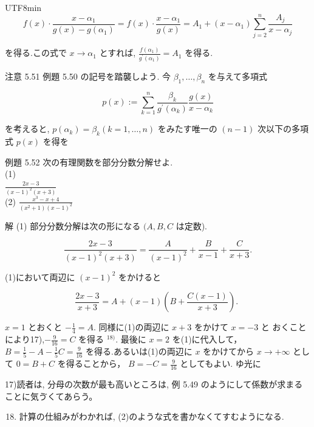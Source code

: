 \documentclass[10pt]{article}
\begin{document}
\begin{CJK}{UTF8}{min}
$$
f(x) \cdot \frac{x-\alpha_{1}}{g(x)-g\left(\alpha_{1}\right)}=f(x) \cdot \frac{x-\alpha_{1}}{g(x)}=A_{1}+\left(x-\alpha_{1}\right) \sum_{j=2}^{n} \frac{A_{j}}{x-\alpha_{j}}
$$

を得る.この式で $x \rightarrow \alpha_{1}$ とすれば, $\frac{f\left(\alpha_{1}\right)}{g^{\prime}\left(\alpha_{1}\right)}=A_{1}$ を得る.

注意 5.51 例題 5.50 の記号を踏襲しよう. 今 $\beta_{1}, \ldots, \beta_{n}$ を与えて多項式

$$
p(x):=\sum_{k=1}^{n} \frac{\beta_{k}}{g^{\prime}\left(\alpha_{k}\right)} \frac{g(x)}{x-\alpha_{k}}
$$

を考えると, $p\left(\alpha_{k}\right)=\beta_{k}(k=1, \ldots, n)$ をみたす唯一の $(n-1)$ 次以下の多項式 $p(x)$ を得を

例題 5.52 次の有理関数を部分分数分解せよ.\\
(1)\\
$\frac{2 x-3}{(x-1)^{2}(x+3)}$\\
(2) $\frac{x^{3}-x+4}{\left(x^{2}+1\right)(x-1)^{2}}$

解 (1) 部分分数分解は次の形になる $(A, B, C$ は定数).


\begin{equation*}
\frac{2 x-3}{(x-1)^{2}(x+3)}=\frac{A}{(x-1)^{2}}+\frac{B}{x-1}+\frac{C}{x+3} . \tag{1}
\end{equation*}


(1)において両辺に $(x-1)^{2}$ をかけると


\begin{equation*}
\frac{2 x-3}{x+3}=A+(x-1)\left(B+\frac{C(x-1)}{x+3}\right) \text {. } \tag{2}
\end{equation*}


$x=1$ とおくと $-\frac{1}{4}=A$. 同様に(1)の両辺に $x+3$ をかけて $x=-3$ と おくことにより17),$-\frac{9}{16}=C$ を得る $^{18)}$. 最後に $x=2$ を(1)に代入して， $B=\frac{1}{5}-A-\frac{1}{5} C=\frac{9}{16}$ を得る.あるいは(1)の両辺に $x$ をかけてから $x \rightarrow+\infty$ として $0=B+C$ を得ることから， $B=-C=\frac{9}{16}$ としてもよい. ゆ光に

17)読者は, 分母の次数が最も高いところは, 例 5.49 のようにして係数が求まることに気ゔくてあらう。

\begin{enumerate}
  \setcounter{enumi}{17}
  \item 計算の仕組みがわかれば, (2)のような式を書かなくてすむようになる.
\end{enumerate}


\end{CJK}
\end{document}
